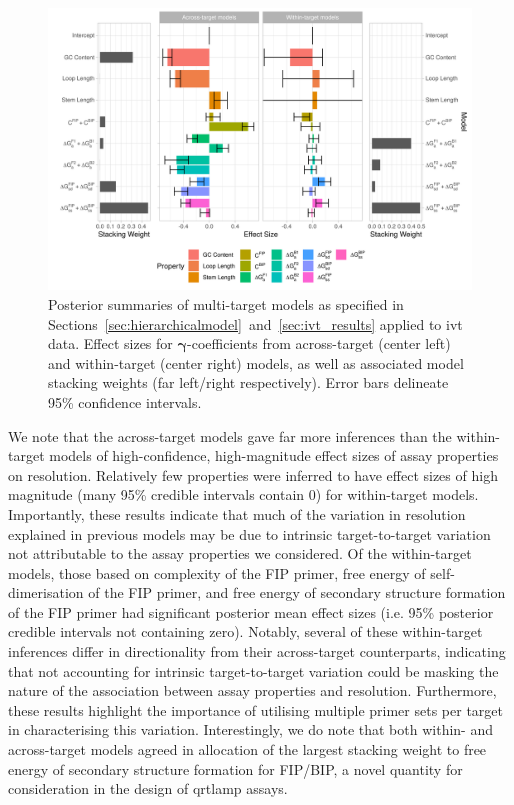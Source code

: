 \documentclass[../thesis.tex]{subfiles}
\begin{document}
\begin{figure}[!tpb] 
\centering
\includegraphics[width=6in]{../figures/chapter2/paper_ivt_eval_fig.png}
\caption{Posterior summaries of multi-target models as specified in Sections~\ref{sec:hierarchicalmodel}~and~\ref{sec:ivt_results} applied to \gls{ivt}  data. Effect sizes for $\bm{\gamma}$-coefficients from across-target (center left) and within-target (center right) models, as well as associated model stacking weights (far left/right respectively). Error bars delineate 95\% confidence intervals. \label{fig:ivt_eval}}
\end{figure}

We note that the across-target models gave far more inferences than the within-target models of high-confidence, high-magnitude effect sizes of assay properties on resolution. Relatively few properties were inferred to have effect sizes of high magnitude (many 95\% credible intervals contain 0) for within-target models. Importantly, these results indicate that much of the variation in resolution explained in previous models may be due to intrinsic target-to-target variation not attributable to the assay properties we considered. Of the within-target models, those based on complexity of the FIP primer, free energy of self-dimerisation of the FIP primer, and free energy of secondary structure formation of the FIP primer had significant posterior mean effect sizes (i.e. 95\% posterior credible intervals not containing zero). Notably, several of these within-target inferences differ in directionality from their across-target counterparts, indicating that not accounting for intrinsic target-to-target variation could be masking the nature of the association between assay properties and resolution. Furthermore, these results highlight the importance of utilising multiple primer sets per target in characterising this variation. Interestingly, we do note that both within- and across-target models agreed in allocation of the largest stacking weight to free energy of secondary structure formation for FIP/BIP, a novel quantity for consideration in the design of \gls{qrtlamp} assays.
\end{document}
